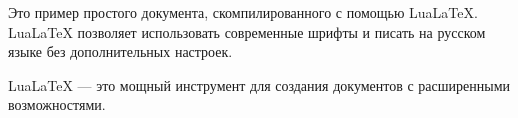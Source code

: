 \documentclass[a4paper,12pt]{article}
\begin{document}
Это пример простого документа, скомпилированного с помощью LuaLaTeX.  
LuaLaTeX позволяет использовать современные шрифты и писать на русском языке без дополнительных настроек.

LuaLaTeX --- это мощный инструмент для создания документов с расширенными возможностями.
\end{document}
